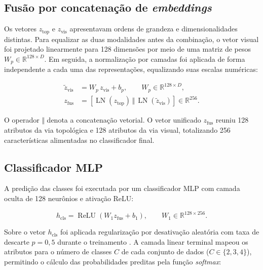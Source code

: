 \subsection{Fusão por concatenação de \textit{embeddings}}
\label{sec:fusao-embeddings}

Os vetores $z_{\mathrm{top}}$ e $z_{\mathrm{vis}}$ apresentavam ordens de grandeza e dimensionalidades distintas. Para equalizar as duas modalidades antes da combinação, o vetor visual foi projetado linearmente para 128 dimensões por meio de uma matriz de pesos $W_p \in \mathbb{R}^{128 \times D}$. Em seguida, a normalização por camadas foi aplicada de forma independente a cada uma das representações, equalizando suas escalas numéricas:

\begin{align}
\tilde{z}_{\mathrm{vis}} &= W_p\, z_{\mathrm{vis}} + b_p, \qquad W_p \in \mathbb{R}^{128 \times D}, \label{eq:met-projecao}\\
z_{\mathrm{fus}} &= \left[\operatorname{LN}(z_{\mathrm{top}})\,\Vert\,\operatorname{LN}(\tilde{z}_{\mathrm{vis}})\right] \in \mathbb{R}^{256}. \label{eq:met-fusao-concat}
\end{align}

O operador $\Vert$ denota a concatenação vetorial. O vetor unificado $z_{\mathrm{fus}}$ reuniu 128 atributos da via topológica e 128 atributos da via visual, totalizando 256 características alimentadas no classificador final.

\subsection{Classificador MLP}
\label{sec:mlp}

A predição das classes foi executada por um classificador MLP \cite{rumelhart1986learning} com camada oculta de 128 neurônios e ativação ReLU:

\begin{equation}
h_{\mathrm{cls}} = \operatorname{ReLU}\left(W_1 z_{\mathrm{fus}} + b_1\right), \qquad W_1 \in \mathbb{R}^{128 \times 256}.
\label{eq:met-mlp-hidden}
\end{equation}

Sobre o vetor $h_{\mathrm{cls}}$ foi aplicada regularização por desativação aleatória com taxa de descarte $p = 0{,}5$ durante o treinamento \cite{srivastava2014dropout}. A camada linear terminal mapeou os atributos para o número de classes $C$ de cada conjunto de dados ($C \in \{2, 3, 4\}$), permitindo o cálculo das probabilidades preditas pela função \textit{softmax}:

